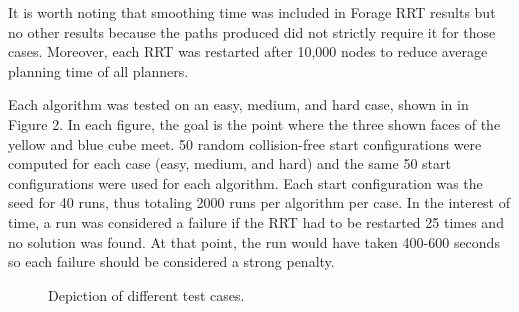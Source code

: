 \documentclass[conference]{IEEEtran}
\begin{document}
It is worth noting that smoothing time was included in Forage RRT results but no other results because the paths produced did not strictly
require it for those cases. Moreover, each RRT was restarted after 10,000 nodes to reduce average planning time of all planners.

Each algorithm was tested on an easy, medium, and hard case, shown in in Figure 2. In each figure, the goal is the point where
the three shown faces of the yellow and blue cube meet. 50 random collision-free start configurations were computed for each case (easy,
medium, and hard) and the same 50 start configurations were used for each algorithm. Each start configuration was the seed for 40 runs, thus
totaling 2000 runs per algorithm per case. In the interest of time, a run was considered a failure if the RRT had to be restarted 25 times
and no solution was found. At that point, the run would have taken 400-600 seconds so each failure should be considered a strong penalty. 

\begin{figure}[t]
  \centering
    \caption{Depiction of different test cases.}
  \label{fig:cases}
\end{figure}
\end{document}
